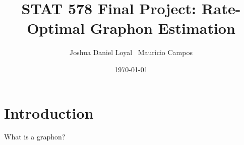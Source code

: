 \documentclass[11pt]{article}
\begin{document}
\title{  {\LARGE STAT 578 Final Project: Rate-Optimal Graphon Estimation} }

\author{
Joshua Daniel Loyal \,
Mauricio Campos
}

\date{\today}
\maketitle

\section{Introduction} \label{sec:intro}
What is a graphon? \citep{gao2015optgraphon}



\end{document}
